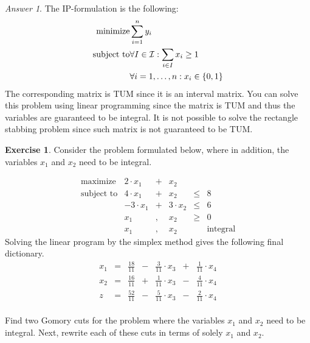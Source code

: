 \documentclass[titlepage]{book}
\theoremstyle{plain}
\theoremstyle{definition}
\newtheorem{exercise}{Exercise}[chapter]
\theoremstyle{remark}
\newtheorem{answer}{Answer}
\begin{document}
\begin{answer}
The IP-formulation is the following:
\begin{eqnarray}
\mbox{minimize}&\sumieqb[i]{1}{n}{y_i}\eqnlab{rsv-m}\\
\mbox{subject to}&\forall I\in\calI:\sumdomain[i]{I}{x_{i}}\geq 1\eqnlab{rsv-c1}\\
&\forall\rangei[i]{1}{n}:x_i\in\accl{0,1}\eqnlab{rsv-c2}
\end{eqnarray}
The corresponding matrix is TUM since it is an interval matrix. You can solve this problem using linear programming since the matrix is TUM and thus the variables are guaranteed to be integral. It is not possible to solve the rectangle stabbing problem since such matrix is not guaranteed to be TUM.
\end{answer}
\begin{exercise}
Consider the problem formulated below, where in addition, the variables $x_1$ and $x_2$ need to be integral.

\begin{equation}
\begin{array}{rrcrcr}
\mbox{maximize}&2\cdot x_1&+&x_2\\
\mbox{subject to}&4\cdot x_1&+&x_2&\leq&8\\
&-3\cdot x_1&+&3\cdot x_2&\leq&6\\
&x_1&,&x_2&\geq&0\\
&x_1&,&x_2&&\mbox{integral}
\end{array}
\end{equation}
Solving the linear program by the simplex method gives the following final dictionary.
\begin{equation}
\begin{array}{rcrcrcr}
x_1&=&\tfrac{18}{11}&-&\tfrac{3}{11}\cdot x_3&+&\tfrac{1}{11}\cdot x_4\\
x_2&=&\tfrac{16}{11}&+&\tfrac{1}{11}\cdot x_3&-&\tfrac{4}{11}\cdot x_4\\\hline
z&=&\tfrac{52}{11}&-&\tfrac{5}{11}\cdot x_3&-&\tfrac{2}{11}\cdot x_4
\end{array}
\end{equation}
\paragraph{}
Find two Gomory cuts for the problem where the variables $x_1$ and $x_2$ need to be integral. Next, rewrite each of these cuts in terms of solely $x_1$ and $x_2$.
\end{exercise}
\end{document}
